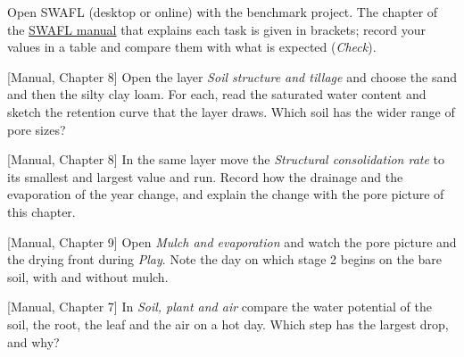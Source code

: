 {\small Open SWAFL (desktop or online) with the benchmark project. The chapter of the \href{https://github.com/halilunaziru73-creator/Coupled-Water-Fluxes-Pore-Scale-Dynamics-Precision-Irrigation-Mulching-Feedback-Loops/raw/main/Software/v1.1.0/SWAFL_Desktop/docs/manual_v1.1.0/SWAFL_Manual_v1.1.0.pdf}{SWAFL manual} that explains each task is given in brackets; record your values in a table and compare them with what is expected (\emph{Check}).}\par\vspace{3pt}
\begin{exlist}
\item {\color{khblue}[Manual, Chapter 8]} Open the layer \emph{Soil structure and tillage} and choose the sand and then the silty clay loam. For each, read the saturated water content and sketch the retention curve that the layer draws. Which soil has the wider range of pore sizes?\par{}
\item {\color{khblue}[Manual, Chapter 8]} In the same layer move the \emph{Structural consolidation rate} to its smallest and largest value and run. Record how the drainage and the evaporation of the year change, and explain the change with the pore picture of this chapter.\par{}
\item {\color{khblue}[Manual, Chapter 9]} Open \emph{Mulch and evaporation} and watch the pore picture and the drying front during \emph{Play}. Note the day on which stage 2 begins on the bare soil, with and without mulch.\par{}
\item {\color{khblue}[Manual, Chapter 7]} In \emph{Soil, plant and air} compare the water potential of the soil, the root, the leaf and the air on a hot day. Which step has the largest drop, and why?\par{}
\end{exlist}
